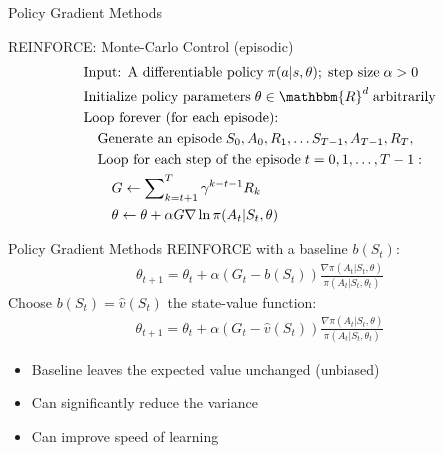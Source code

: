 \documentclass[ignorenonframetext,xcolor=x11names]{beamer}
\begin{document}
\begin{frame}{Policy Gradient Methods}
\begin{block}{REINFORCE: Monte-Carlo Control (episodic)}
\begin{align*}
& \text{Input: A differentiable policy}\;\pi(a | s, \theta);\;\text{step size}\; \alpha > 0 \\
& \text{Initialize policy parameters}\; \theta \in \mathbbm{R}^d\;\text{arbitrarily} \\
& \text{Loop forever (for each episode):} \\
& \quad \text{Generate an episode}\; S_0, A_0, R_1, \ldots S_{T-1}, A_{T-1}, R_T, \\
& \quad \text{Loop for each step of the episode}\;t=0, 1, \ldots, T-1:\\
& \quad \quad G \leftarrow \sum\nolimits_{k=t+1}^T \gamma^{k - t - 1}R_k \\
& \quad \quad \theta \leftarrow \theta + \alpha G \nabla \ln \pi(A_t | S_t, \theta)
\end{align*}
\end{block}
\end{frame}

\begin{frame}{Policy Gradient Methods}
REINFORCE with a baseline $b(S_t)$:
\begin{align*}
\theta_{t+1} = \theta_t + \alpha(G_t - b(S_t)) \frac{\nabla \pi(A_t | S_t, \theta)}{\pi(A_t | S_t, \theta_t)}
\end{align*}
Choose $b(S_t) = \hat{v}(S_t)$ the state-value function:
\begin{align*}
\theta_{t+1} = \theta_t + \alpha(G_t - \hat{v}(S_t)) \frac{\nabla \pi(A_t | S_t, \theta)}{\pi(A_t | S_t, \theta_t)}
\end{align*}
\begin{itemize}
   \item Baseline leaves the expected value unchanged (unbiased)
   \item Can significantly reduce the variance
   \item Can improve speed of learning
\end{itemize} 
\end{frame}
\end{document}
